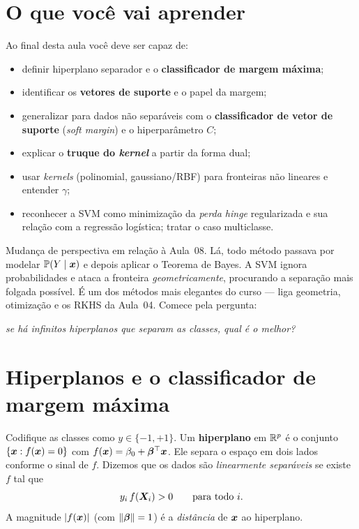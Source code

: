 \documentclass[11pt,a4paper]{article}
\title{}
\date{}
\begin{document}

\section*{O que você vai aprender}
Ao final desta aula você deve ser capaz de:
\begin{itemize}[leftmargin=1.4cm]
  \item definir hiperplano separador e o \textbf{classificador de margem máxima};
  \item identificar os \textbf{vetores de suporte} e o papel da margem;
  \item generalizar para dados não separáveis com o \textbf{classificador de vetor
        de suporte} (\emph{soft margin}) e o hiperparâmetro $C$;
  \item explicar o \textbf{truque do \emph{kernel}} a partir da forma dual;
  \item usar \emph{kernels} (polinomial, gaussiano/RBF) para fronteiras não
        lineares e entender $\gamma$;
  \item reconhecer a SVM como minimização da \emph{perda \emph{hinge}} regularizada
        e sua relação com a regressão logística; tratar o caso multiclasse.
\end{itemize}

\noindent
Mudança de perspectiva em relação à Aula~08. Lá, todo método passava por modelar
$\mathbb{P}(Y\mid\bm{x})$ e depois aplicar o Teorema de Bayes. A SVM ignora probabilidades e
ataca a fronteira \emph{geometricamente}, procurando a separação mais folgada
possível. É um dos métodos mais elegantes do curso --- liga geometria, otimização e
os RKHS da Aula~04. Comece pela pergunta:

\begin{center}\itshape
  se há infinitos hiperplanos que separam as classes, qual é o melhor?
\end{center}

\section{Hiperplanos e o classificador de margem máxima}
Codifique as classes como $y\in\{-1,+1\}$. Um \textbf{hiperplano} em $\mathbb{R}^p$ é o
conjunto $\{\bm{x}: f(\bm{x})=0\}$ com $f(\bm{x})=\beta_0+\bm{\beta}^\top\bm{x}$. Ele separa o espaço
em dois lados conforme o sinal de $f$. Dizemos que os dados são \emph{linearmente
separáveis} se existe $f$ tal que
\begin{equation}\label{eq:sep}
  y_i\,f(\bm{X}_i) > 0 \qquad \text{para todo } i.
\end{equation}
A magnitude $\left\lvert f(\bm{x}) \right\rvert$ (com $\left\lVert \bm{\beta} \right\rVert=1$) é a \emph{distância} de $\bm{x}$ ao
hiperplano.
\end{document}
